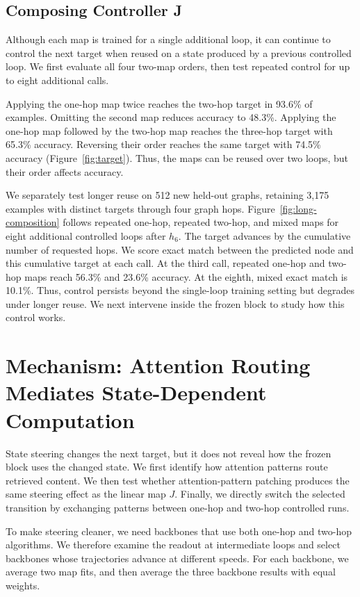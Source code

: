 \documentclass{article}
\begin{document}
\subsection{Composing Controller J}
\label{sec:composition}
Although each map is trained for a single additional loop, it can continue to control the next target when reused on a state produced by a previous controlled loop. We first evaluate all four two-map orders, then test repeated control for up to eight additional calls.

Applying the one-hop map twice reaches the two-hop target in 93.6\% of examples. Omitting the second map reduces accuracy to 48.3\%. Applying the one-hop map followed by the two-hop map reaches the three-hop target with 65.3\% accuracy. Reversing their order reaches the same target with 74.5\% accuracy (Figure~\ref{fig:target}). Thus, the maps can be reused over two loops, but their order affects accuracy.

We separately test longer reuse on 512 new held-out graphs, retaining 3,175 examples with distinct targets through four graph hops. Figure~\ref{fig:long-composition} follows repeated one-hop, repeated two-hop, and mixed maps for eight additional controlled loops after $h_6$. The target advances by the cumulative number of requested hops. We score exact match between the predicted node and this cumulative target at each call. At the third call, repeated one-hop and two-hop maps reach 56.3\% and 23.6\% accuracy. At the eighth, mixed exact match is 10.1\%. Thus, control persists beyond the single-loop training setting but degrades under longer reuse. We next intervene inside the frozen block to study how this control works.



\section{Mechanism: Attention Routing Mediates State-Dependent Computation}
\label{sec:hypothesis}\label{sec:large}
State steering changes the next target, but it does not reveal how the frozen block uses the changed state. We first identify how attention patterns route retrieved content. We then test whether attention-pattern patching produces the same steering effect as the linear map $J$. Finally, we directly switch the selected transition by exchanging patterns between one-hop and two-hop controlled runs.

To make steering cleaner, we need backbones that use both one-hop and two-hop algorithms. We therefore examine the readout at intermediate loops and select backbones whose trajectories advance at different speeds. For each backbone, we average two map fits, and then average the three backbone results with equal weights.
\end{document}
